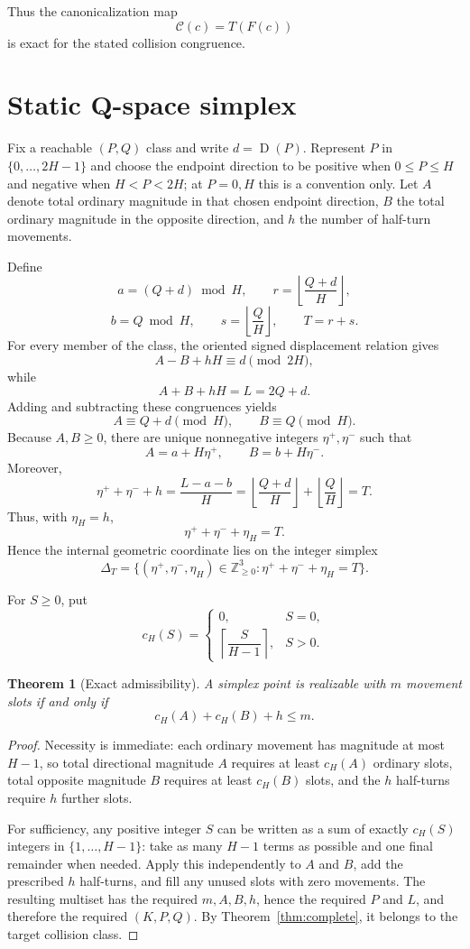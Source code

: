 \documentclass[11pt]{article}
\newtheorem{theorem}{Theorem}
\theoremstyle{definition}
\newcommand{\Z}{\mathbb{Z}}
\newcommand{\D}{\operatorname{D}}
\newcommand{\1}{\mathbf{1}}
\begin{document}
Thus the canonicalization map
\[
\mathcal C(c)=T(F(c))
\]
is exact for the stated collision congruence.

\section{Static Q-space simplex}
Fix a reachable $(P,Q)$ class and write $d=\D(P)$. Represent $P$ in $\{0,\ldots,2H-1\}$ and choose the endpoint direction to be positive when $0\le P\le H$ and negative when $H<P<2H$; at $P=0,H$ this is a convention only. Let $A$ denote total ordinary magnitude in that chosen endpoint direction, $B$ the total ordinary magnitude in the opposite direction, and $h$ the number of half-turn movements.

Define
\[
a=(Q+d)\bmod H,\qquad
r=\left\lfloor\frac{Q+d}{H}\right\rfloor,
\]
\[
b=Q\bmod H,\qquad
s=\left\lfloor\frac QH\right\rfloor,
\qquad
T=r+s.
\]
For every member of the class, the oriented signed displacement relation gives
\[
A-B+hH\equiv d\pmod{2H},
\]
while
\[
A+B+hH=L=2Q+d.
\]
Adding and subtracting these congruences yields
\[
A\equiv Q+d\pmod H,\qquad B\equiv Q\pmod H.
\]
Because $A,B\ge0$, there are unique nonnegative integers $\eta^+,\eta^-$ such that
\[
A=a+H\eta^+,\qquad
B=b+H\eta^-.
\]
Moreover,
\[
\eta^++\eta^-+h
=\frac{L-a-b}{H}
=\left\lfloor\frac{Q+d}{H}\right\rfloor+\left\lfloor\frac QH\right\rfloor
=T.
\]
Thus, with $\eta_H=h$,
\[
\boxed{
\eta^++\eta^-+\eta_H=T.
}
\]
Hence the internal geometric coordinate lies on the integer simplex
\[
\Delta_T=\{(\eta^+,\eta^-,\eta_H)\in\Z_{\ge0}^3:
\eta^++\eta^-+\eta_H=T\}.
\]

For $S\ge0$, put
\[
c_H(S)=
\begin{cases}
0,&S=0,\\[3pt]
\left\lceil\dfrac{S}{H-1}\right\rceil,&S>0.
\end{cases}
\]

\begin{theorem}[Exact admissibility]
A simplex point is realizable with $m$ movement slots if and only if
\[
\boxed{
c_H(A)+c_H(B)+h\le m.
}
\]
\end{theorem}

\begin{proof}
Necessity is immediate: each ordinary movement has magnitude at most $H-1$, so total directional magnitude $A$ requires at least $c_H(A)$ ordinary slots, total opposite magnitude $B$ requires at least $c_H(B)$ slots, and the $h$ half-turns require $h$ further slots.

For sufficiency, any positive integer $S$ can be written as a sum of exactly $c_H(S)$ integers in $\{1,\ldots,H-1\}$: take as many $H-1$ terms as possible and one final remainder when needed. Apply this independently to $A$ and $B$, add the prescribed $h$ half-turns, and fill any unused slots with zero movements. The resulting multiset has the required $m,A,B,h$, hence the required $P$ and $L$, and therefore the required $(K,P,Q)$. By Theorem~\ref{thm:complete}, it belongs to the target collision class.
\end{proof}
\end{document}
